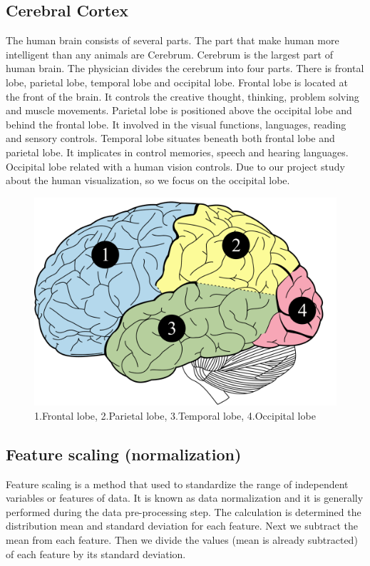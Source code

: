 \subsection{Cerebral Cortex}

\hspace{1.5cm} The human brain consists of several parts. The part that make human more intelligent than any animals are Cerebrum. Cerebrum is the largest part of human brain. The physician divides the cerebrum into four parts. There is frontal lobe, parietal lobe, temporal lobe and occipital lobe. Frontal lobe is located at the front of the brain. It controls the creative thought, thinking, problem solving and muscle movements. Parietal lobe is positioned above the occipital lobe and behind the frontal lobe. It involved in the visual functions, languages, reading and sensory controls. Temporal lobe situates beneath both frontal lobe and parietal lobe. It implicates in control memories, speech and hearing languages. Occipital lobe related with a human vision controls. Due to our project study about the human visualization, so we focus on the occipital lobe.

\begin{figure}[h]
	\centering
	\includegraphics[scale = 0.32]{chapter3/33.pdf}
	\caption{1.Frontal lobe, 2.Parietal lobe, 3.Temporal lobe, 4.Occipital lobe}
\end{figure}

\newpage
\subsection{Feature scaling (normalization)}

\hspace{1.5cm} Feature scaling is a method that used to standardize the range of independent variables or features of data. It is known as data normalization and it is generally performed during the data pre-processing step. The calculation is determined the distribution mean and standard deviation for each feature. Next we subtract the mean from each feature. Then we divide the values (mean is already subtracted) of each feature by its standard deviation.\cite{ref10}  


